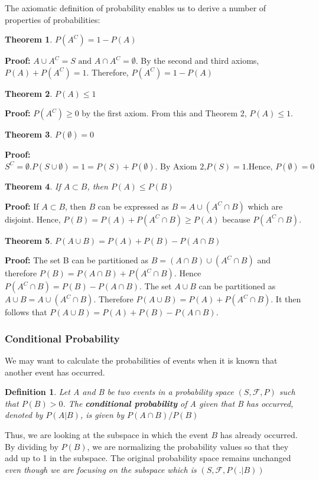 \documentclass{article}
\newtheorem{definition}{Definition}[section]
\newtheorem{theorem}{Theorem}[section]
\begin{document}
The axiomatic definition of probability enables us to derive a number of properties of probabilities:

\begin{theorem}
    \( P(A^C)=1-P(A)\)
\end{theorem}

\textbf{Proof:} \(A \cup A^C = S \text{ and } A \cap A^C = \emptyset\). By the second and third axioms, \(P(A) + P(A^C)=1\). Therefore, \(P(A^C)=1-P(A)\)

\begin{theorem}
    \(P(A) \leq 1\)
\end{theorem}

\textbf{Proof:} \(P(A^C) \geq 0\) by the first axiom. From this and Theorem 2, \(P(A) \leq 1\).

\begin{theorem}
    \(P(\emptyset)=0\)
\end{theorem}

\textbf{Proof:} \(S^C=\emptyset. P(S \cup \emptyset)= 1 = P(S)+P(\emptyset). \text{ By Axiom 2,}  P(S)=1. \text{Hence, } P(\emptyset)=0\)

\begin{theorem}
    If \(A \subset B\), then \(P(A) \leq P(B)\)
\end{theorem}

\textbf{Proof:} If \(A \subset B\), then \(B\) can be expressed as \(B = A \cup (A^C \cap B)\) which are disjoint. Hence, \(P(B)=P(A)+P(A^C \cap B) \geq P(A)\) because \(P(A^C \cap B)\).

\begin{theorem}
    \(P(A \cup B) = P(A) + P(B) - P(A \cap B)\)
\end{theorem}

\textbf{Proof:} The set B can be partitioned as \(B = (A \cap B) \cup (A^C \cap B)\) and therefore \(P(B) = P(A \cap B) + P(A^C \cap B)\). Hence \(P(A^C \cap B) = P(B) - P(A \cap B)\). The set \(A \cup B\) can be partitioned as \(A \cup B = A \cup (A^C \cap B)\). Therefore \(P(A \cup B) = P(A) + P(A^C \cap B)\). It then follows that \(P(A \cup B) = P(A) + P(B) - P(A \cap B)\).

\subsubsection{Conditional Probability}
We may want to calculate the probabilities of events when it is known that another event has occurred.
\begin{definition}
    Let A and B be two events in a probability space \((S, \mathcal{F}, P)\) such that \(P(B) > 0\). The \textbf{conditional probability} of A given that B has occurred, denoted by \(P(A|B)\), is given by \(P(A \cap B)/P(B)\)
\end{definition}
Thus, we are looking at the subspace in which the event \(B\) has already occurred. By dividing by \(P(B)\), we are normalizing the probability values so that they add up to 1 in the subspace. The original probability space remains unchanged \textit{even though we are focusing on the subspace which is} \((S, \mathcal{F}, P( . |B))\)
\end{document}
